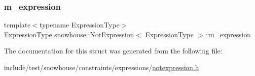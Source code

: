 \subsubsection{\texorpdfstring{m\_expression}{m\_expression}}
{\footnotesize\ttfamily template$<$typename Expression\+Type$>$ \\
Expression\+Type \mbox{\hyperlink{structsnowhouse_1_1NotExpression}{snowhouse\+::\+Not\+Expression}}$<$ Expression\+Type $>$\+::m\+\_\+expression}



The documentation for this struct was generated from the following file\+:\begin{DoxyCompactItemize}
\item 
include/test/snowhouse/constraints/expressions/\mbox{\hyperlink{notexpression_8h}{notexpression.\+h}}\end{DoxyCompactItemize}
